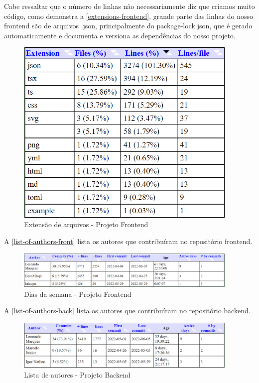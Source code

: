 Cabe ressaltar que o número de linhas não necessariamente diz que criamos muito código, como demonstra a \autoref{extensions-frontend}, grande parte das linhas do nosso frontend são de arquivos .json, principalmente do package-lock.json, que é gerado automaticamente e documenta e versiona as dependências do nosso projeto.
\begin{figure}[H]
	\centering
	\caption{\label{extensions-frontend}Extensão de arquivos - Projeto Frontend}
	\includegraphics[width=0.95\textwidth]{../imagens/stats/extensions-frontend.png}
\end{figure}

A \autoref{list-of-authors-front} lista os autores que contribuíram no repositório frontend.
\begin{figure}[H]
	\centering
	\caption{\label{list-of-authors-front}Dias da semana - Projeto Frontend}
	\includegraphics[width=0.95\textwidth]{../imagens/stats/list-of-authors-frontend.png}
\end{figure}

A \autoref{list-of-authors-back} lista os autores que contribuíram no repositório backend.
\begin{figure}[H]
	\centering
	\caption{\label{list-of-authors-back}Lista de autores - Projeto Backend}
	\includegraphics[width=0.95\textwidth]{../imagens/stats/list-of-authors-backend.png}
\end{figure}

